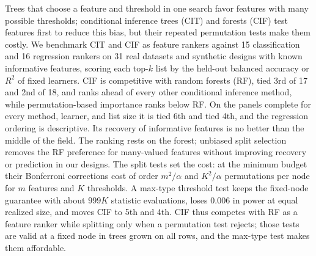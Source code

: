Trees that choose a feature and threshold in one search favor features with
many possible thresholds; conditional inference trees (CIT) and forests (CIF)
test features first to reduce this bias, but their repeated permutation tests
make them costly. We benchmark CIT and CIF as feature rankers against 15
classification and 16 regression rankers on 31 real datasets and synthetic
designs with known informative features, scoring each top-$k$ list by the
held-out balanced accuracy or $R^2$ of fixed learners. CIF is competitive
with random forests (RF), tied 3rd of 17 and 2nd of 18, and ranks ahead of every
other conditional inference method, while permutation-based importance ranks
below RF. On the panels complete for every method, learner, and list size it is
tied 6th and tied 4th, and the regression ordering is descriptive. Its recovery
of informative features is no better than the middle of the field. The ranking rests on the forest; unbiased split selection removes
the RF preference for many-valued features without improving recovery or
prediction in our designs. The split tests set the cost: at the minimum budget their Bonferroni
corrections cost of order $m^2/\alpha$ and $K^2/\alpha$ permutations per node
for $m$ features and $K$ thresholds. A max-type threshold test keeps the
fixed-node guarantee with about $999K$ statistic evaluations, loses 0.006 in
power at equal realized size, and moves CIF to 5th and 4th. CIF thus competes
with RF as a feature ranker while splitting only when a permutation test
rejects; those tests are valid at a fixed node in trees grown on all rows, and
the max-type test makes them affordable.
